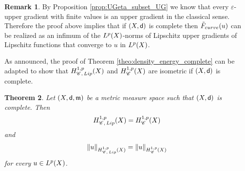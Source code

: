 \documentclass[12pt]{amsart}
\newcommand{\sfd}{{\sf d}}
\newcommand{\X}{{\rm X}}
\newcommand{\Lip}{{\rm Lip}}
\newcommand{\mm}{\mathfrak m}
\newtheorem{theorem}{Theorem}[section]
\theoremstyle{definition}
\newtheorem{remark}[theorem]{Remark}
\newcommand{\Chain}[1]{\mathscr{C}^{#1}}
\newcommand{\HH}[2]{H^{1,#1}_{{\rm #2}}}
\newcommand{\relF}[1]{\tilde{\rm F}_{{\rm #1}}}
\begin{document}
\begin{remark}
\label{rmk:UG-UGLip}
    By Proposition \ref{prop:UGeta_subset_UG} we know that every $\varepsilon$-upper gradient with finite values is an upper gradient in the classical sense. Therefore the proof above implies that if $(\X,\sfd)$ is complete then $\relF{curve}(u)$ can be realized as an infimum of the $L^p(\X)$-norms of Lipschitz upper gradients of Lipschitz functions that converge to $u$ in $L^p(\X)$. 
\end{remark}

As announced, the proof of Theorem \ref{theo:density_energy_complete} can be adapted to show that $\HH{p}{\Chain{}, \, \Lip}(\X)$ and $\HH{p}{\Chain{}}(\X)$ are isometric if $(\X,\sfd)$ is complete.
\begin{theorem}
    \label{theo:density-energy-chains-complete}
    Let $(\X,\sfd,\mm)$ be a metric measure space such that $(\X,\sfd)$ is complete. Then 
    \begin{equation}
        \HH{p}{\Chain{},\, \Lip}(\X) = \HH{p}{\Chain{}}(\X)
    \end{equation}
    and
    \begin{equation}
        \|u \|_{\HH{p}{\Chain{},\, \Lip}(\X)}  = \|u \|_{\HH{p}{\Chain{}}(\X)}
    \end{equation}
    for every $u\in L^p(\X)$.
\end{theorem}
\end{document}
